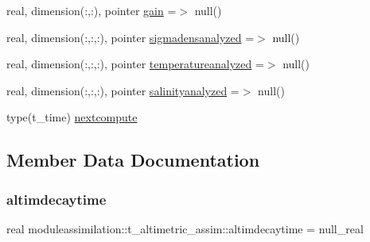 \begin{DoxyCompactItemize}
real, dimension(\+:,\+:), pointer \mbox{\hyperlink{structmoduleassimilation_1_1t__altimetric__assim_a1ba81b39d585933dcdb69343a1f281db}{gain}} =$>$ null()
\item 
real, dimension(\+:,\+:,\+:), pointer \mbox{\hyperlink{structmoduleassimilation_1_1t__altimetric__assim_aa6934acb3ea6c737fc9f237333b0e323}{sigmadensanalyzed}} =$>$ null()
\item 
real, dimension(\+:,\+:,\+:), pointer \mbox{\hyperlink{structmoduleassimilation_1_1t__altimetric__assim_a9dfb2a49ba0fd6ca50309cd8d09a175a}{temperatureanalyzed}} =$>$ null()
\item 
real, dimension(\+:,\+:,\+:), pointer \mbox{\hyperlink{structmoduleassimilation_1_1t__altimetric__assim_a4c17fc3f72c90cf667672c07a61bd9c2}{salinityanalyzed}} =$>$ null()
\item 
type(t\+\_\+time) \mbox{\hyperlink{structmoduleassimilation_1_1t__altimetric__assim_a95837627a8f84b69c35afbe0bad84a67}{nextcompute}}
\end{DoxyCompactItemize}


\subsection{Member Data Documentation}
\mbox{\label{structmoduleassimilation_1_1t__altimetric__assim_aa97b029c5de5aad72de9955efc0af9c9}} 
\subsubsection{\texorpdfstring{altimdecaytime}{altimdecaytime}}
{\footnotesize\ttfamily real moduleassimilation\+::t\+\_\+altimetric\+\_\+assim\+::altimdecaytime = null\+\_\+real\hspace{0.3cm}{\ttfamily [private]}}

\mbox{\label{structmoduleassimilation_1_1t__altimetric__assim_af87ed940a4406a343eed264225b91eee}} 
